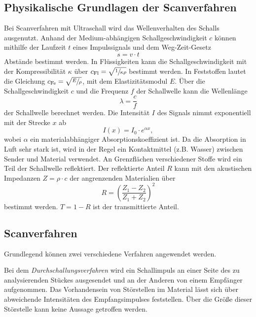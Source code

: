 \subsection{Physikalische Grundlagen der Scanverfahren}
\label{subsec:Grundlagen}
Bei Scanverfahren mit Ultraschall wird das Wellenverhalten des Schalls ausgenutzt. Anhand der Medium-abhängigen Schallgeschwindigkeit $c$ können mithilfe der
Laufzeit $t$ eines Impulssignals und dem Weg-Zeit-Gesetz
\begin{equation}
    \label{eqn:WegZeit}
    s = v \cdot t
\end{equation} 
Abstände bestimmt werden.
In Flüssigkeiten kann die Schallgeschwindigkeit mit der Kompressibilität $\kappa$ über $c_\text{Fl} = \sqrt{\sfrac{1}{\kappa \rho}}$ bestimmt werden. In Feststoffen
lautet die Gleichung $c_\text{Fe} = \sqrt{\sfrac{E}{\rho}}$, mit dem Elastizitätsmodul $E$. Über die Schallgeschwindigkeit $c$ und die Frequenz $f$ der Schallwelle 
kann die Wellenlänge
\begin{equation}
    \label{eqn:lambda}
    \lambda = \frac{c}{f}
\end{equation}
der Schallwelle berechnet werden.
Die Intensität $I$ des Signals nimmt exponentiell mit der Strecke $x$ ab
\begin{equation*}
    I(x) = I_0 \cdot e^{\alpha x},
\end{equation*}
wobei $\alpha$ ein materialabhängiger Absorptionskoeffizient ist. Da die Absorption in Luft sehr stark ist, wird in der Regel ein Kontaktmittel (z.B. Wasser) zwischen
Sender und Material verwendet.
An Grenzflächen verschiedener Stoffe wird ein Teil der Schallwelle reflektiert. Der reflektierte Anteil $R$ kann mit den akustischen Impedanzen $Z = \rho \cdot c$ der 
angrenzenden Materialien über
\begin{equation*}
    \label{eqn:Reflektion}
    R = \left(\frac{Z_1 - Z_2}{Z_1 + Z_2}\right)^2
\end{equation*}
bestimmt werden. $T = 1 - R$ ist der transmittierte Anteil.

\subsection{Scanverfahren}
\label{subsec:Scanverfahren}
Grundlegend können zwei verschiedene Verfahren angewendet werden. 

Bei dem \textit{Durchschallungsverfahren} wird ein Schallimpuls an einer Seite des zu analysierenden Stückes ausgesendet und an der Anderen von einem Empfänger 
aufgenommen. Das Vorhandensein von Störstellen im Material lässt sich über abweichende Intensitäten des Empfangsimpulses feststellen. Über die Größe dieser Störstelle
kann keine Aussage getroffen werden.

